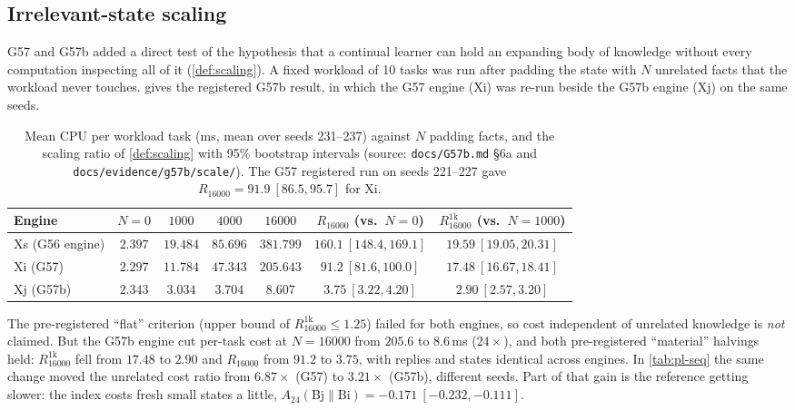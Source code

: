 \documentclass[11pt]{article}
\theoremstyle{remark}
\begin{document}
\subsection{Irrelevant-state scaling}\label{sec:pl-scale}
G57 and G57b added a direct test of the hypothesis that a continual learner can hold an expanding body of knowledge without every computation inspecting all of it (\cref{def:scaling}). A fixed workload of 10 tasks was run after padding the state with $N$ unrelated facts that the workload never touches.  gives the registered G57b result, in which the G57 engine (Xi) was re-run beside the G57b engine (Xj) on the same seeds.

\begin{table}[ht]
\centering\small
\begin{tabular}{@{}lcccccc@{}}
\toprule
Engine & $N=0$ & $1000$ & $4000$ & $16000$ & $R_{16000}$ (vs.\ $N{=}0$) & $R^{1\mathrm{k}}_{16000}$ (vs.\ $N{=}1000$)\\
\midrule
Xs (G56 engine) & $2.397$ & $19.484$ & $85.696$ & $381.799$ & $160.1\ [148.4,169.1]$ & $19.59\ [19.05,20.31]$\\
Xi (G57) & $2.297$ & $11.784$ & $47.343$ & $205.643$ & $91.2\ [81.6,100.0]$ & $17.48\ [16.67,18.41]$\\
Xj (G57b) & $2.343$ & $3.034$ & $3.704$ & $8.607$ & $3.75\ [3.22,4.20]$ & $2.90\ [2.57,3.20]$\\
\bottomrule
\end{tabular}
\caption{Mean CPU per workload task (ms, mean over seeds 231--237) against $N$ padding facts, and the scaling ratio of \cref{def:scaling} with 95\% bootstrap intervals (source: \texttt{docs/G57b.md} \S6a and \texttt{docs/evidence/g57b/scale/}). The G57 registered run on seeds 221--227 gave $R_{16000}=91.9\ [86.5,95.7]$ for Xi.}
\label{tab:pl-scale}
\end{table}

The pre-registered ``flat'' criterion (upper bound of $R^{1\mathrm{k}}_{16000}\le 1.25$) failed for both engines, so cost independent of unrelated knowledge is \emph{not} claimed. But the G57b engine cut per-task cost at $N=16000$ from $205.6$ to $8.6$\,ms ($24\times$), and both pre-registered ``material'' halvings held: $R^{1\mathrm{k}}_{16000}$ fell from $17.48$ to $2.90$ and $R_{16000}$ from $91.2$ to $3.75$, with replies and states identical across engines.
In \cref{tab:pl-seq} the same change moved the unrelated cost ratio from $6.87\times$ (G57) to $3.21\times$ (G57b), different seeds. Part of that gain is the reference getting slower: the index costs fresh small states a little, $A_{24}(\text{Bj}\|\text{Bi})=-0.171\ [-0.232,-0.111]$.
\end{document}
